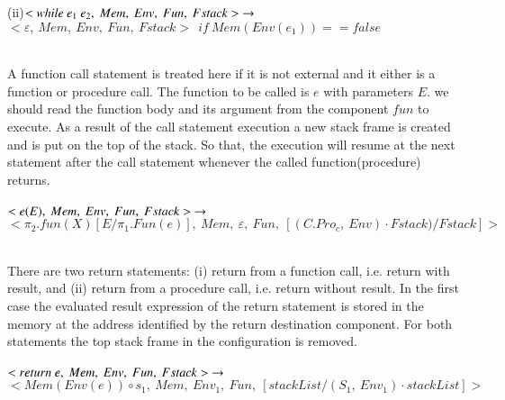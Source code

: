 \documentclass[conference]{IEEEtran}
\begin{document}
(ii)$<while~e_1~e_2,~Mem,~Env,~Fun,~Fstack>~\rightarrow\\ \\$
$<\varepsilon,~Mem,~Env,~Fun,~Fstack>~~if~Mem(Env(e_1))==false$\\ \\
\par A function call statement is treated here if it is not external and it either is a function or
procedure call. The function to be called is $e$ with parameters $E$. we should read the function body and its argument from the component $fun$ to execute. As a result of the
call statement execution a new stack frame is created and is put on the top of the stack. So
that, the execution will resume at the next statement after the call statement whenever
the called function(procedure) returns. \\ \\
$<e(E),~Mem,~Env,~Fun,~Fstack>~\rightarrow\\ \\$
$<\pi_{2}.fun(X)[E/\pi_1.Fun(e)],~Mem,~\varepsilon,~Fun,~[(C.Pro_c,~Env)\cdot Fstack)/Fstack]>$\\ \\
\par There are two return statements: (i) return from a function call, i.e. return
with result, and (ii) return from a procedure call, i.e. return without result. In the first
case the evaluated result expression of the return statement is stored in the memory
at the address identified by the return destination component. For both statements the top stack frame in the configuration is removed. \\ \\
$<return~e,~Mem,~Env,~Fun,~Fstack>~\rightarrow\\ \\$
$<Mem(Env(e))\circ s_1,~Mem,~Env_1,~Fun,~[stackList/(S_1,~Env_1)\cdot stackList]>$\\ \\
\end{document}
